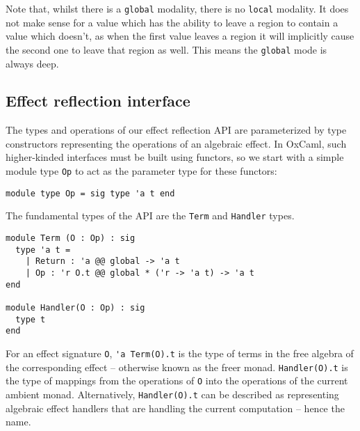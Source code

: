 \documentclass[acmsmall, screen, nonacm]{acmart}
\theoremstyle{definition}
\begin{document}
Note that, whilst there is a \lstinline[style=ocaml]{global} modality,
there is no \lstinline[style=ocaml]{local} modality. It does not make
sense for a value which has the ability to leave a region to contain a
value which doesn't, as when the first value leaves a region it will
implicitly cause the second one to leave that region as well. This means
the \lstinline[style=ocaml]{global} mode is always deep.

\subsection{Effect reflection interface}
\label{sec:interface}

The types and operations of our effect reflection API are parameterized
by type constructors representing the operations of an algebraic
effect. In OxCaml, such higher-kinded interfaces must be built using
functors, so we start with a simple module type
\lstinline[style=ocaml]{Op} to act as the parameter type for these
functors:
\begin{lstlisting}[style=ocaml]
module type Op = sig type 'a t end
\end{lstlisting}
The fundamental types of the API are the \lstinline[style=ocaml]{Term}
and \lstinline[style=ocaml]{Handler} types.
\begin{lstlisting}[style=ocaml]
module Term (O : Op) : sig
  type 'a t =
    | Return : 'a @@ global -> 'a t
    | Op : 'r O.t @@ global * ('r -> 'a t) -> 'a t
end

module Handler(O : Op) : sig
  type t
end
\end{lstlisting}
For an effect signature \lstinline[style=ocaml]{O},
\lstinline[style=ocaml]{'a Term(O).t} is the type of terms in the free
algebra of the corresponding effect -- otherwise known as the freer
monad\cite{??}. \lstinline[style=ocaml]{Handler(O).t} is the type of
mappings from the operations of \lstinline[style=ocaml]{O} into the
operations of the current ambient monad. Alternatively,
\lstinline[style=ocaml]{Handler(O).t} can be described as representing
algebraic effect handlers that are handling the current computation --
hence the name.
\end{document}
